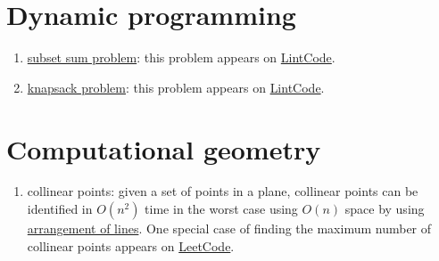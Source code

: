 \section{Dynamic programming}
\begin{enumerate}
\item \href{https://en.wikipedia.org/wiki/Subset_sum_problem}{subset sum problem}: this problem appears on \href{http://www.lintcode.com/en/problem/backpack/}{LintCode}.
\item \href{https://en.wikipedia.org/wiki/Knapsack_problem}{knapsack problem}: this problem appears on \href{http://www.lintcode.com/en/problem/backpack-ii/}{LintCode}.
\end{enumerate}

\section{Computational geometry}
\begin{enumerate}
\item collinear points: given a set of points in a plane, collinear points can be identified in $O(n^2)$ time in the worst case using $O(n)$ space by using \href{https://en.wikipedia.org/wiki/Arrangement_of_lines#Algorithms}{arrangement of lines}. One special case of finding the maximum number of collinear points appears on \href{https://leetcode.com/problems/max-points-on-a-line/}{LeetCode}.
\end{enumerate}



\printbibliography[heading=subbibliography]
